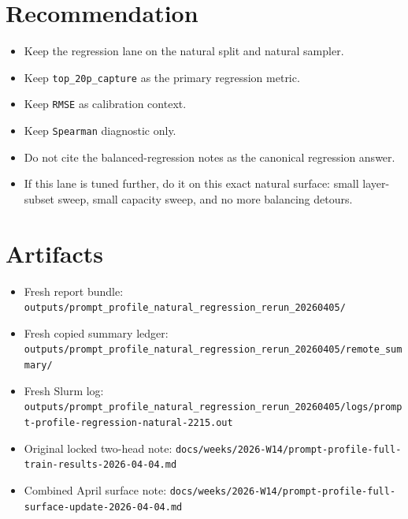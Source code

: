 \documentclass[11pt]{article}
\begin{document}
\section{Recommendation}

\begin{itemize}
\item Keep the regression lane on the natural split and natural sampler.
\item Keep \texttt{top\_20p\_capture} as the primary regression metric.
\item Keep \texttt{RMSE} as calibration context.
\item Keep \texttt{Spearman} diagnostic only.
\item Do not cite the balanced-regression notes as the canonical regression answer.
\item If this lane is tuned further, do it on this exact natural surface:
  small layer-subset sweep, small capacity sweep, and no more balancing detours.
\end{itemize}

\section{Artifacts}

\begin{itemize}
\item Fresh report bundle:
  \texttt{outputs/prompt\_profile\_natural\_regression\_rerun\_20260405/}
\item Fresh copied summary ledger:
  \texttt{outputs/prompt\_profile\_natural\_regression\_rerun\_20260405/remote\_summary/}
\item Fresh Slurm log:
  \texttt{outputs/prompt\_profile\_natural\_regression\_rerun\_20260405/logs/prompt-profile-regression-natural-2215.out}
\item Original locked two-head note:
  \texttt{docs/weeks/2026-W14/prompt-profile-full-train-results-2026-04-04.md}
\item Combined April surface note:
  \texttt{docs/weeks/2026-W14/prompt-profile-full-surface-update-2026-04-04.md}
\end{itemize}
\end{document}
